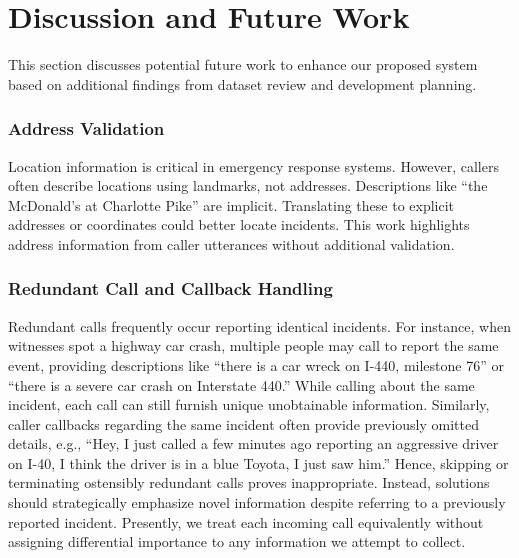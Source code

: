 \section{Discussion and Future Work}
This section discusses potential future work to enhance our proposed system based on additional findings from dataset review and development planning.

\subsubsection{Address Validation}
Location information is critical in emergency response systems. However, callers often describe locations using landmarks, not addresses. Descriptions like ``the McDonald's at Charlotte Pike'' are implicit. Translating these to explicit addresses or coordinates could better locate incidents. This work highlights address information from caller utterances without additional validation.


\subsubsection{Redundant Call and Callback Handling}
Redundant calls frequently occur reporting identical incidents. For instance, when witnesses spot a highway car crash, multiple people may call to report the same event, providing descriptions like ``there is a car wreck on I-440, milestone 76'' or ``there is a severe car crash on Interstate 440.'' While calling about the same incident, each call can still furnish unique unobtainable information. Similarly, caller callbacks regarding the same incident often provide previously omitted details, e.g., ``Hey, I just called a few minutes ago reporting an aggressive driver on I-40, I think the driver is in a blue Toyota, I just saw him.'' Hence, skipping or terminating ostensibly redundant calls proves inappropriate. Instead, solutions should strategically emphasize novel information despite referring to a previously reported incident. Presently, we treat each incoming call equivalently without assigning differential importance to any information we attempt to collect.



